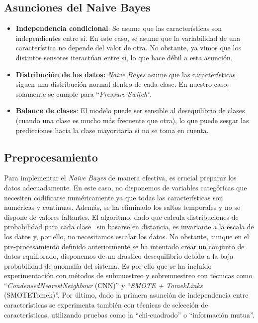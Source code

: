 \documentclass[12pt,letterpaper]{article}
\begin{document}
\subsection{Asunciones del Naive Bayes}
\begin{itemize}
    \item \textbf{Independencia condicional}: Se asume que las características son independientes entre sí. 
        En este caso, se asume que la variabilidad de una característica no depende del valor de otra. No obstante, ya vimos que los distintos sensores iteractúan entre sí, lo que hace débil a esta asunción.
    \item \textbf{Distribución de los datos:} \textit{Naive Bayes} asume que las características siguen una distribución normal dentro de cada clase. En nuestro caso, solamente se cumple para ``\textit{Pressure Switch}''.
    \item \textbf{Balance de clases}: El modelo puede ser sensible al desequilibrio de clases (cuando una clase es mucho más frecuente que otra), lo que puede sesgar las predicciones hacia la clase mayoritaria si no se toma en cuenta.
\end{itemize}

\subsection{Preprocesamiento}

Para implementar el \textit{Naive Bayes} de manera efectiva, es crucial preparar los datos adecuadamente. 
En este caso, no disponemos de variables categóricas que necesiten codificarse numéricamente ya que todas las características son numéricas y continuas. 
Además, se ha eliminado los saltos temporales y no se dispone de valores faltantes.
El algoritmo, dado que calcula distribuciones de probabilidad para cada clase~\cite{NaiveBayes} sin basarse en distancia, es invariante a la escala de los datos y, por ello, no necesitamos escalar los datos.
No obstante, aunque en el pre-procesamiento definido anteriormente se ha intentado crear un conjunto de datos equilibrado, disponemos de un drástico desequilibrio debido a la baja probabilidad de anomalía del sistema.
Es por ello que se ha incluído experimentación con métodos de submuestreo y sobremuestreo con técnicas como ``\textit{CondensedNearestNeighbour} (CNN)'' y ``\textit{SMOTE + TomekLinks} (SMOTETomek)''.
Por último, dado la primera asunción de independencia entre características se experimenta también con técnicas de selección de características, utilizando pruebas como la ``chi-cuadrado'' o ``información mutua''.
\end{document}
